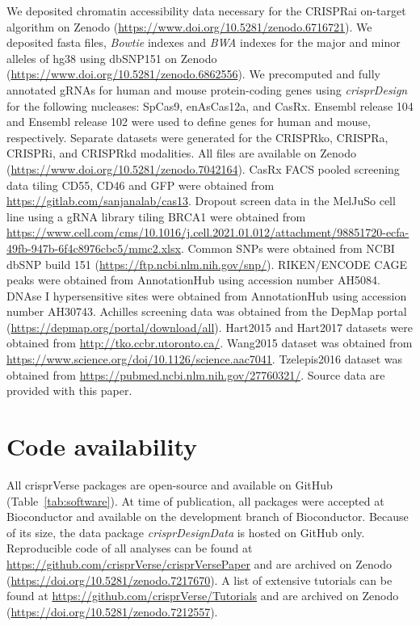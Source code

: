 \documentclass[pdftex,english,10pt]{article}
\begin{document}
{We deposited chromatin accessibility data necessary for the CRISPRai on-target algorithm on Zenodo (\url{https://www.doi.org/10.5281/zenodo.6716721}).
We deposited fasta files, \textit{Bowtie} indexes and \textit{BWA} indexes for the major and minor alleles of hg38 using dbSNP151 on Zenodo (\url{https://www.doi.org/10.5281/zenodo.6862556}). We precomputed and fully annotated gRNAs for human and mouse protein-coding genes using \textit{crisprDesign} for the following nucleases: SpCas9, enAsCas12a, and CasRx. Ensembl release 104 and Ensembl release 102 were used to define genes for human and mouse, respectively. Separate datasets were generated for the CRISPRko, CRISPRa, CRISPRi, and CRISPRkd modalities. All files are available on Zenodo (\url{https://www.doi.org/10.5281/zenodo.7042164}).  CasRx FACS pooled screening data tiling CD55, CD46 and GFP were obtained from \url{https://gitlab.com/sanjanalab/cas13}. 
Dropout screen data in the MelJuSo cell line using a gRNA library tiling BRCA1 were obtained from \url{https://www.cell.com/cms/10.1016/j.cell.2021.01.012/attachment/98851720-ecfa-49fb-947b-6f4c8976cbc5/mmc2.xlsx}. Common SNPs were obtained from NCBI dbSNP build 151 (\url{https://ftp.ncbi.nlm.nih.gov/snp/}).
RIKEN/ENCODE CAGE peaks were obtained from AnnotationHub using accession number AH5084.
DNAse I hypersensitive sites were obtained from AnnotationHub using accession number AH30743. 
Achilles screening data was obtained from the DepMap portal (\url{https://depmap.org/portal/download/all}).
Hart2015 and Hart2017 datasets were obtained from \url{http://tko.ccbr.utoronto.ca/}.
Wang2015 dataset was obtained from \url{https://www.science.org/doi/10.1126/science.aac7041}.
Tzelepis2016 dataset was obtained from \url{https://pubmed.ncbi.nlm.nih.gov/27760321/}. 
Source data are provided with this paper.








\section*{Code availability}

All crisprVerse packages are open-source and available on GitHub (Table~\ref{tab:software}).
At time of publication, all packages were accepted at Bioconductor and available on the development branch of Bioconductor.
Because of its size, the data package \textit{crisprDesignData} is hosted on GitHub only. 
Reproducible code of all analyses can be found at \url{https://github.com/crisprVerse/crisprVersePaper} and are archived on Zenodo (\url{https://doi.org/10.5281/zenodo.7217670}).
A list of extensive tutorials can be found at \url{https://github.com/crisprVerse/Tutorials} and are archived on Zenodo (\url{https://doi.org/10.5281/zenodo.7212557}).

}
\end{document}
